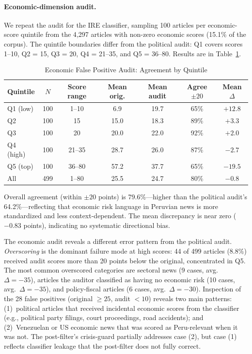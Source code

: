 \documentclass[12pt,a4paper]{article}
\begin{document}
\paragraph{Economic-dimension audit.}
We repeat the audit for the IRE classifier, sampling 100 articles per
economic-score quintile from the 4{,}297 articles with non-zero economic scores
(15.1\% of the corpus).  The quintile boundaries differ from the political
audit: Q1 covers scores 1--10, Q2 = 15, Q3 = 20, Q4 = 21--35, and Q5 = 36--80.
Results are in Table~\ref{tab:econ_fp_audit}.

\begin{table}[h]
\centering
\small
\caption{Economic False Positive Audit: Agreement by Quintile}
\label{tab:econ_fp_audit}
\begin{tabular}{lcccccc}
\toprule
Quintile & $N$ & Score range & Mean orig. & Mean audit & Agree $\pm 20$ & Mean $\Delta$ \\
\midrule
Q1 (low)   & 100 & 1--10   &  6.9 & 19.7 & 65\% & $+12.8$ \\
Q2         & 100 & 15      & 15.0 & 18.3 & 89\% & $+3.3$  \\
Q3         & 100 & 20      & 20.0 & 22.0 & 92\% & $+2.0$  \\
Q4 (high)  & 100 & 21--35  & 28.7 & 26.0 & 87\% & $-2.7$  \\
Q5 (top)   & 100 & 36--80  & 57.2 & 37.7 & 65\% & $-19.5$ \\
\midrule
All        & 499 & 1--80   & 25.5 & 24.7 & 80\% & $-0.8$  \\
\bottomrule
\end{tabular}
\end{table}

Overall agreement (within $\pm 20$ points) is 79.6\%---higher than the
political audit's 64.2\%---reflecting that economic risk language in
Peruvian news is more standardized and less context-dependent.  The mean
discrepancy is near zero ($-0.83$ points), indicating no systematic
directional bias.

The economic audit reveals a different error pattern from the political
audit.  \emph{Overscoring} is the dominant failure mode at high scores:
44 of 499 articles (8.8\%) received audit scores more than 20 points
below the original, concentrated in Q5.  The most common overscored
categories are sectoral news (9 cases, avg.\ $\Delta = -35$), articles the
auditor classified as having no economic risk (10 cases, avg.\ $\Delta = -35$),
and policy-fiscal articles (6 cases, avg.\ $\Delta = -30$).  Inspection of
the 28 false positives (original $\geq 25$, audit $< 10$) reveals two main
patterns: (1)~political articles that received incidental economic scores
from the classifier (e.g., political party filings, court proceedings, road
accidents); and (2)~Venezuelan or US economic news that was scored as
Peru-relevant when it was not.  The post-filter's crisis-guard partially
addresses case (2), but case (1) reflects classifier leakage that the
post-filter does not fully correct.
\end{document}
